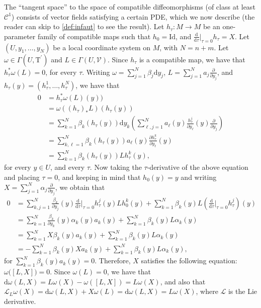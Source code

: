 \documentclass[11pt]{amsart}
\newcommand{\diffable}[1]{\mathcal{C}^{#1}}
\theoremstyle{definition}
\theoremstyle{remark}
\theoremstyle{plain}
\begin{document}
The ``tangent space'' to the space of compatible diffeomorphisms (of class at least $\diffable{1}$) consists of
vector fields satisfying a certain PDE, which we now describe (the reader can skip to
\cref{def:infaut} to see the result). Let $h_\tau : M \longrightarrow M$ be an one-parameter family of compatible maps such that $h_0 = \text{Id}$, and $\frac{\mathrm{d}}{\mathrm{d} \tau} \big|_{\tau = 0} h_\tau = X$. Let $(U, y_1, \dots, y_{N})$ be a local coordinate system on $M$, with $N = n+m$. Let  $\omega \in \Gamma(U, \mathrm{T}^\prime)$ and $L \in \Gamma(U, \mathcal{V})$. Since $h_\tau$ is a compatible map, we have that $h_\tau^*\omega(L) = 0$, for every $\tau$. Writing $\omega = \sum_{j = 1}^N \beta_j \mathrm{d} y_j$, $L = \sum_{j = 1}^N a_j \frac{\partial}{\partial y_j}$, and $h_\tau(y) = (h_\tau^1, \dots, h_\tau^N)$, we have that
%
\begin{align*}
	0 & = h_\tau^\ast\omega(L)(y)) \\
	& =  \omega((h_\tau)_\ast L)(h_\tau(y)) \\
	& = \sum_{k = 1}^N \beta_k(h_\tau(y)) \mathrm{d}y_k \left(\sum_{\ell,j = 1}^N a_\ell(y) \frac{h_\tau^j}{\partial y_\ell}(y) \frac{\partial}{\partial y_j} \right) \\
	& = \sum_{k, \ell = 1}^N \beta_k(h_\tau(y)) a_\ell(y) \frac{\partial h_\tau^k}{\partial y_\ell}(y) \\
	& = \sum_{k = 1}^N \beta_k(h_\tau(y)) Lh_\tau^k(y),
\end{align*}
%
for every $y \in U$, and every $\tau$. Now taking the $\tau$-derivative of the above equation and placing $\tau = 0$, and keeping in mind that $h_0(y) = y$ and writing $X = \sum_{j = 1}^N \alpha_j \frac{\partial}{\partial y_j}$, we obtain that
%
\begin{align*}
	0 & = \sum_{k,j = 1}^N \frac{\beta_k}{\partial y_j}(y)\frac{\mathrm{d}}{\mathrm{d} \tau}\Big|_{\tau = 0} h_\tau^j (y) L h_0^k(y) + \sum_{k = 1}^N \beta_k(y) L \left( \frac{\mathrm{d}}{\mathrm{d} \tau}\Big|_{\tau = 0} h_\tau^j \right) (y) \\
	& = \sum_{k = 1}^N \frac{\beta_k}{\partial y_k}(y)\alpha_k(y) a_k(y) + \sum_{k = 1}^N \beta_k(y) L \alpha_k (y) \\
	& =  \sum_{k = 1}^N X \beta_k (y) a_k(y) + \sum_{k = 1}^N \beta_k(y) L \alpha_k (y) \\
	& = - \sum_{k = 1}^N  \beta_k (y) X a_k(y) + \sum_{k = 1}^N \beta_k(y) L \alpha_k (y),
\end{align*}
%
for $\sum_{k = 1}^N \beta_k(y) a_k(y) = 0$. Therefore, $X$ satisfies the following equation: $\omega \big( [L, X] \big) = 0$. Since $\omega(L) = 0$, we have that $\mathrm{d}\omega(L, X) = L \omega(X) - \omega([L,X]) = L \omega(X)$, and also that $\mathcal{L}_L \omega(X) = \mathrm{d}\omega(L,X) + X \omega(L) = \mathrm{d} \omega(L,X) = L \omega(X)$, where $\mathcal{L}$ is the Lie derivative. 
\end{document}
